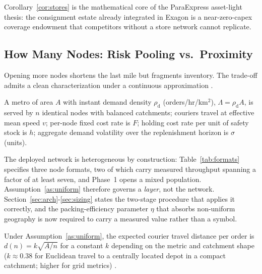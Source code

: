 Corollary~\ref{cor:stores} is the mathematical core of the ParaExpress asset-light thesis: the consignment estate already integrated in Exagon is a near-zero-capex coverage endowment that competitors without a store network cannot replicate.

\subsection{How Many Nodes: Risk Pooling vs.\ Proximity}

Opening more nodes shortens the last mile but fragments inventory. The trade-off admits a clean characterization under a continuous approximation \cite{eppen1979,daganzo1984}.

\begin{assumption}\label{as:uniform}
A metro of area $A$ with instant demand density $\rho_{\mathrm{d}}$ (orders/hr/km$^2$), $\Lambda=\rho_{\mathrm{d}}A$, is served by $n$ identical nodes with balanced catchments; couriers travel at effective mean speed $v$; per-node fixed cost rate is $F$; holding cost rate per unit of safety stock is $h$; aggregate demand volatility over the replenishment horizon is $\sigma$ (units).
\end{assumption}

\begin{remark}
The deployed network is heterogeneous by construction: Table~\ref{tab:formats} specifies three node formats, two of which carry measured throughput spanning a factor of at least seven, and Phase~1 opens a mixed population. Assumption~\ref{as:uniform} therefore governs a \emph{layer}, not the network. Section~\ref{sec:arch}-\ref{sec:sizing} states the two-stage procedure that applies it correctly, and the packing-efficiency parameter $\eta$ that absorbs non-uniform geography is now required to carry a measured value rather than a symbol. 
\end{remark}

\begin{lemma}\label{lem:lastmile}
Under Assumption~\ref{as:uniform}, the expected courier travel distance per order is $d(n)=k\sqrt{A/n}$ for a constant $k$ depending on the metric and catchment shape ($k\approx0.38$ for Euclidean travel to a centrally located depot in a compact catchment; higher for grid metrics) \cite{daganzo1984}.
\end{lemma}

